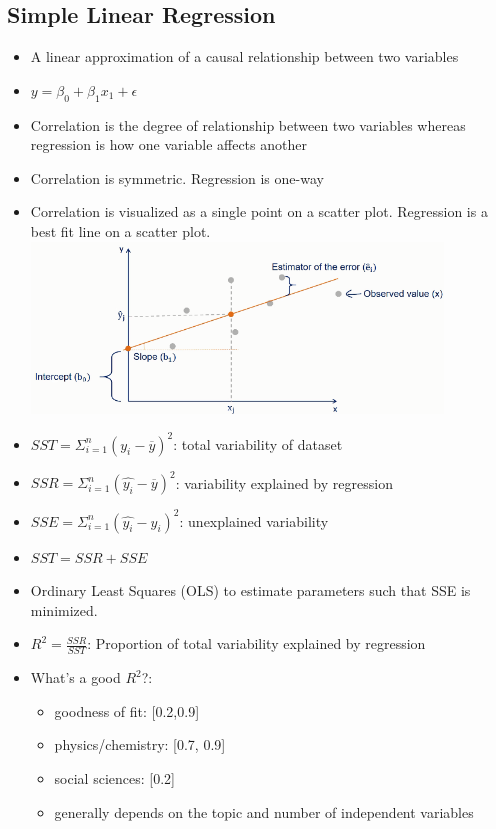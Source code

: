 \documentclass{article}
\begin{document}
\begin{multicols*}{3}
        \section{Simple Linear Regression}
    \renewcommand\labelitemi{{\boldmath$\cdot$}}
    \begin{itemize}[noitemsep]
        \item A linear approximation of a causal relationship between two variables
        \item $y = \beta_0 + \beta_1 x_1 + \epsilon$
        \item Correlation is the degree of relationship between two variables whereas
        regression is how one variable affects another
        \item Correlation is symmetric. Regression is one-way 
        \item Correlation is visualized as a single point on a scatter plot. 
        Regression is a best fit line on a scatter plot.
        \includegraphics[width=\linewidth]{simple_linear_regression_chart}
        \item $SST = \Sigma_{i=1}^n(y_i-\overline{y})^2$: 
        total variability of dataset
        \item $SSR = \Sigma_{i=1}^n(\hat{y_i}-\overline{y})^2$: 
        variability explained by regression
        \item $SSE = \Sigma_{i=1}^n(\hat{y_i} - y_i)^2$:
        unexplained variability
        \item $SST = SSR + SSE$
        \item Ordinary Least Squares (OLS) to estimate parameters such that SSE 
        is minimized.
        \item $R^2 = \frac{SSR}{SST}$: Proportion of total variability explained by 
        regression
        \item What's a good $R^2$?:
        \begin{itemize}
            \item goodness of fit: [0.2,0.9]
            \item physics/chemistry: [0.7, 0.9]
            \item social sciences: [0.2]
            \item generally depends on the topic and number of independent variables
        \end{itemize}
    \end{itemize}



\end{multicols*}
\end{document}
